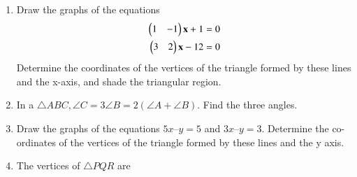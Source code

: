 \renewcommand{\theequation}{\theenumi}
\begin{enumerate}[label=\arabic*.,ref=\thesubsection.\theenumi]
%
\item Draw the graphs of the equations 
\begin{align}
\label{eq:1.2.1_p1}
\begin{pmatrix}1 & -1\end{pmatrix}\mathbf{x} + 1 &= 0 
\\
\begin{pmatrix} 3 & 2\end{pmatrix}\mathbf{x} - 12 &= 0
\label{eq:1.2.1_p2}
\end{align}
%
 Determine the coordinates of the vertices of the triangle formed by these lines and the x-axis, and shade the triangular region.
\\
\solution

%
\item In a $\triangle ABC, \angle C = 3 \angle B = 2 (\angle A + \angle B)$. Find the three angles. 
\item Draw the graphs of the equations $5x – y = 5$ and $3x – y = 3$. Determine the co-ordinates of the vertices of the triangle formed by these lines and the y axis.
\\
\solution


\item The vertices of $\triangle PQR$ are 


\end{enumerate}
